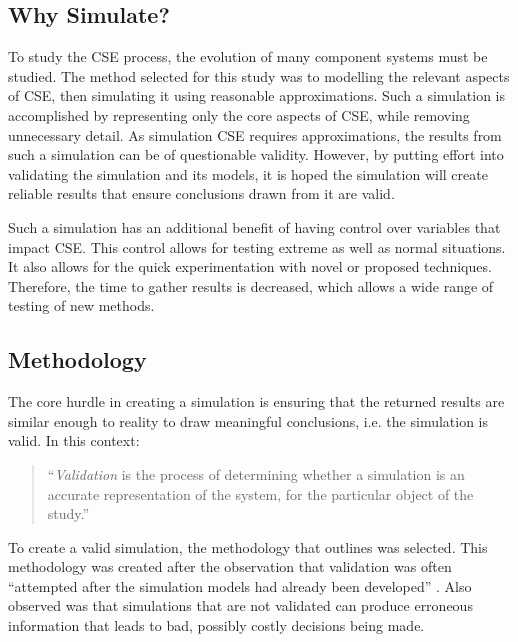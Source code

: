 \subsection{Why Simulate?}
To study the CSE process, the evolution of many component systems must be studied.
The method selected for this study was to modelling the relevant aspects of CSE, then simulating it using reasonable approximations.
Such a simulation is accomplished by representing only the core aspects of CSE, while removing unnecessary detail.
As simulation CSE requires approximations, the results from such a simulation can be of questionable validity.
However, by putting effort into validating the simulation and its models,
it is hoped the simulation will create reliable results that ensure conclusions drawn from it are valid.

Such a simulation has an additional benefit of having control over variables that impact CSE.
This control allows for testing extreme as well as normal situations.
It also allows for the quick experimentation with novel or proposed techniques.
Therefore, the time to gather results is decreased, which allows a wide range of testing of new methods.

\subsection{Methodology}
The core hurdle in creating a simulation is ensuring that the returned results are similar enough to reality to draw meaningful conclusions, i.e. the simulation is valid.
In this context:
\begin{quotation}
``\textit{Validation} is the process of determining whether a simulation is an accurate representation of the system, for the particular object of the study.'' \citep{Law2005}
\end{quotation}

To create a valid simulation, the methodology that \cite{Law2005} outlines was selected.
This methodology was created after the observation that validation was often ``attempted after the simulation models had already been developed'' \citep{Law2005}.
Also observed was that simulations that are not validated can produce erroneous information that leads to bad, possibly costly decisions being made.

